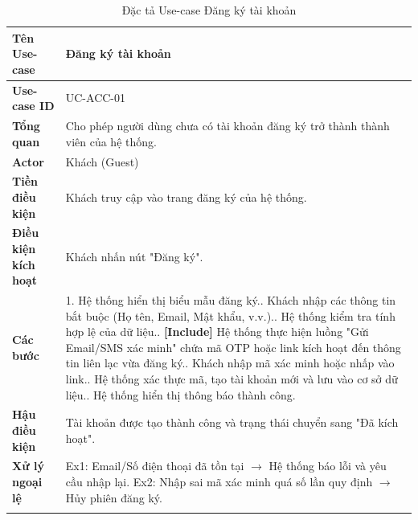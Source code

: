 \begin{longtable}{|p{3.5cm}|p{11.5cm}|}
    \hline
    \textbf{Tên Use-case} & \textbf{Đăng ký tài khoản} \\
    \hline
    \textbf{Use-case ID} & UC-ACC-01 \\
    \hline
    \textbf{Tổng quan} & Cho phép người dùng chưa có tài khoản đăng ký trở thành thành viên của hệ thống. \\
    \hline
    \textbf{Actor} & Khách (Guest) \\
    \hline
    \textbf{Tiền điều kiện} & Khách truy cập vào trang đăng ký của hệ thống. \\
    \hline
    \textbf{Điều kiện kích hoạt} & Khách nhấn nút "Đăng ký". \\
    \hline
    \textbf{Các bước} & 
    1. Hệ thống hiển thị biểu mẫu đăng ký.\newline
    2. Khách nhập các thông tin bắt buộc (Họ tên, Email, Mật khẩu, v.v.).\newline
    3. Hệ thống kiểm tra tính hợp lệ của dữ liệu.\newline
    4. \textbf{[Include]} Hệ thống thực hiện luồng "Gửi Email/SMS xác minh" chứa mã OTP hoặc link kích hoạt đến thông tin liên lạc vừa đăng ký.\newline
    5. Khách nhập mã xác minh hoặc nhấp vào link.\newline
    6. Hệ thống xác thực mã, tạo tài khoản mới và lưu vào cơ sở dữ liệu.\newline
    7. Hệ thống hiển thị thông báo thành công. \\
    \hline
    \textbf{Hậu điều kiện} & Tài khoản được tạo thành công và trạng thái chuyển sang "Đã kích hoạt". \\
    \hline
    \textbf{Xử lý ngoại lệ} & 
    Ex1: Email/Số điện thoại đã tồn tại $\rightarrow$ Hệ thống báo lỗi và yêu cầu nhập lại.\newline
    Ex2: Nhập sai mã xác minh quá số lần quy định $\rightarrow$ Hủy phiên đăng ký. \\
    \hline
    \caption{Đặc tả Use-case Đăng ký tài khoản}
\end{longtable}

